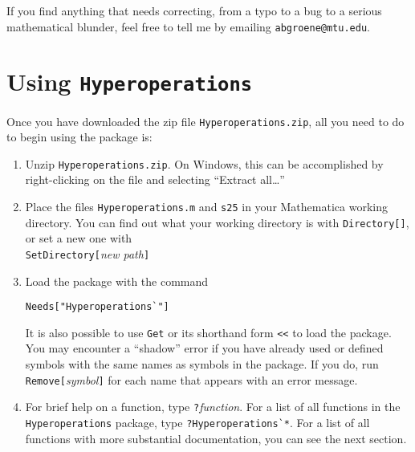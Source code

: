 \documentclass[letterpaper]{article}
\begin{document}
If you find anything that needs correcting, from a typo to a bug to a serious mathematical blunder, feel free to tell me by emailing \verb|abgroene@mtu.edu|. \pagebreak

\section{Using \texttt{Hyperoperations}}
Once you have downloaded the zip file \verb|Hyperoperations.zip|, all you need to do to begin using the package is:
\begin{enumerate}
\item Unzip \verb|Hyperoperations.zip|. On Windows, this can be accomplished by right-clicking on the file and selecting ``Extract all\ldots''
\item Place the files \verb|Hyperoperations.m| and \verb|s25| in your Mathematica working directory.  You can find out what your working directory is with \verb|Directory[]|, or set a new one with \\
\verb|SetDirectory[|\emph{new path}\verb|]| \\
\item Load the package with the command
\begin{verbatim}
Needs["Hyperoperations`"]
\end{verbatim}
It is also possible to use \verb|Get| or its shorthand form \verb|<<| to load the package.   You may encounter a ``shadow'' error if you have already used or defined symbols with the same names as symbols in the package.  If you do, run \verb|Remove[|\emph{symbol}\verb|]| for each name that appears with an error message.
\item For brief help on a function, type \verb|?|\emph{function}.  For a list of all functions in the \texttt{Hyperoperations} package, type \verb|?Hyperoperations`*|.  For a list of all functions with more substantial documentation, you can see the next section.
\end{enumerate}
\end{document}
